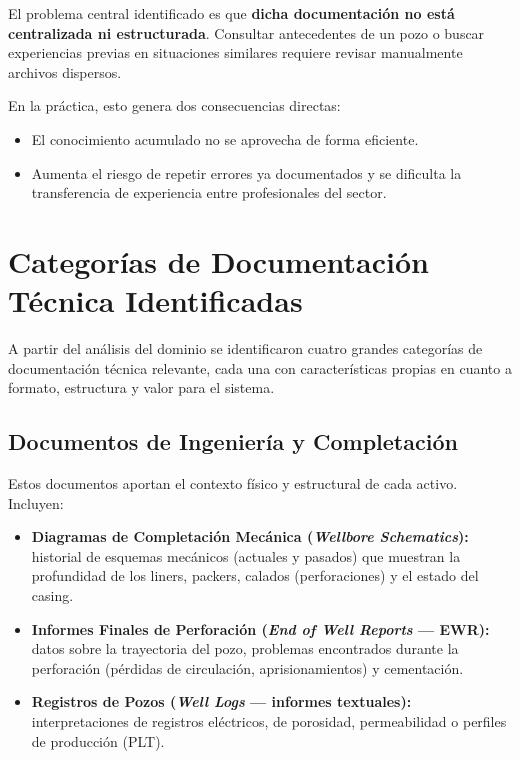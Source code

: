 \documentclass[12pt, a4paper]{article}
\begin{document}
El problema central identificado es que \textbf{dicha documentaci\'{o}n no est\'{a}
centralizada ni estructurada}. Consultar antecedentes de un pozo o buscar experiencias
previas en situaciones similares requiere revisar manualmente archivos dispersos.

En la pr\'{a}ctica, esto genera dos consecuencias directas:

\begin{itemize}
  \item El conocimiento acumulado no se aprovecha de forma eficiente.
  \item Aumenta el riesgo de repetir errores ya documentados y se dificulta la
        transferencia de experiencia entre profesionales del sector.
\end{itemize}

\section{Categor\'{i}as de Documentaci\'{o}n T\'{e}cnica Identificadas}

A partir del an\'{a}lisis del dominio se identificaron cuatro grandes categor\'{i}as de
documentaci\'{o}n t\'{e}cnica relevante, cada una con caracter\'{i}sticas propias en cuanto
a formato, estructura y valor para el sistema.

\subsection{Documentos de Ingenier\'{i}a y Completaci\'{o}n}

Estos documentos aportan el contexto f\'{i}sico y estructural de cada activo. Incluyen:

\begin{itemize}
  \item \textbf{Diagramas de Completaci\'{o}n Mec\'{a}nica (\textit{Wellbore Schematics}):}
        historial de esquemas mec\'{a}nicos (actuales y pasados) que muestran la profundidad de
        los liners, packers, calados (perforaciones) y el estado del casing.
  \item \textbf{Informes Finales de Perforaci\'{o}n (\textit{End of Well Reports} --- EWR):}
        datos sobre la trayectoria del pozo, problemas encontrados durante la perforaci\'{o}n
        (p\'{e}rdidas de circulaci\'{o}n, aprisionamientos) y cementaci\'{o}n.
  \item \textbf{Registros de Pozos (\textit{Well Logs} --- informes textuales):}
        interpretaciones de registros el\'{e}ctricos, de porosidad, permeabilidad o perfiles de
        producci\'{o}n (PLT).
\end{itemize}
\end{document}
